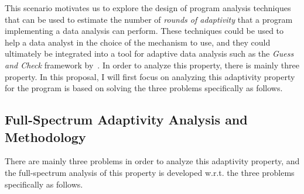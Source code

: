 This scenario motivates us to explore the design of program analysis techniques that can be used to estimate the number of \emph{rounds of adaptivity} that a program implementing a data analysis can perform. These techniques could be used to help a data analyst in the choice of the mechanism to use,
and they
could ultimately be integrated into a tool for adaptive data analysis such as the \emph{Guess and Check} framework by~\cite{RogersRSSTW20}. 
%
In order to analyze this property, there is mainly three property. 
In this proposal, I will first focus on analyzing 
this adaptivity property for the program is based on solving the three problems specifically as follows.

\subsection{Full-Spectrum Adaptivity Analysis and Methodology}
\label{subsec:intro-adapt}
There are mainly three problems in order to analyze this adaptivity property, 
and the full-spectrum analysis of this property is 
developed w.r.t. the three problems specifically as follows.

